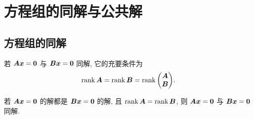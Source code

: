 \section{方程组的同解与公共解}

\subsection{方程组的同解}

\begin{theorem}[同解与秩的等价形式]
    若 $\vb*{Ax}=\vb*{0}$ 与 $\vb*{Bx}=\vb*{0}$ 同解, 它的充要条件为 $$\rank\vb*{A}=\rank\vb*{B}=\rank\mqty(\vb*{A}\\\vb*{B}).$$
\end{theorem}

\begin{theorem}
    若 $\vb*{Ax}=\vb*{0}$ 的解都是 $\vb*{Bx}=\vb*{0}$ 的解, 且 $\rank\vb*{A}=\rank\vb*{B}$, 则 $\vb*{Ax}=\vb*{0}$ 与 $\vb*{Bx}=\vb*{0}$ 同解.
\end{theorem}

